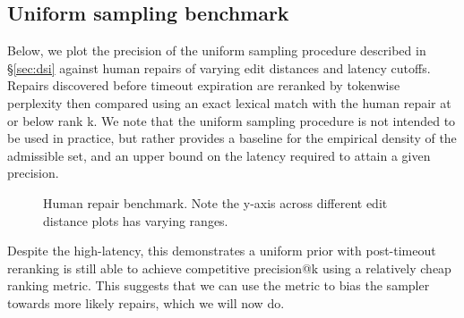 \documentclass[runningheads]{llncs}
\begin{document}
\subsection{Uniform sampling benchmark}\label{sec:uniform}

Below, we plot the precision of the uniform sampling procedure described in \S\ref{sec:dsi} against human repairs of varying edit distances and latency cutoffs. Repairs discovered before timeout expiration are reranked by tokenwise perplexity then compared using an exact lexical match with the human repair at or below rank k. We note that the uniform sampling procedure is not intended to be used in practice, but rather provides a baseline for the empirical density of the admissible set, and an upper bound on the latency required to attain a given precision.

\begin{figure}[H]
  \resizebox{.3\textwidth}{!}{}
  \resizebox{.3\textwidth}{!}{}
  \resizebox{.3\textwidth}{!}{}
  \caption{Human repair benchmark. Note the y-axis across different edit distance plots has varying ranges.}\label{fig:human}
\end{figure}

Despite the high-latency, this demonstrates a uniform prior with post-timeout reranking is still able to achieve competitive precision@k using a relatively cheap ranking metric. This suggests that we can use the metric to bias the sampler towards more likely repairs, which we will now do.
\end{document}
